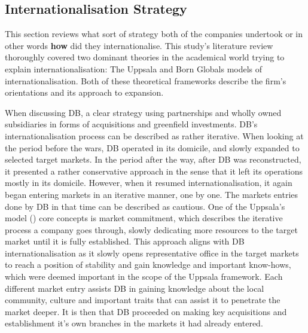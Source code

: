 \documentclass[11pt,a4paper]{article}
\begin{document}
{{{\subsection{Internationalisation Strategy}
\label{int_strategy}
This section reviews what sort of strategy both of the companies undertook or in other words \textbf{how} did they internationalise. This study's literature review thoroughly covered two dominant theories in the academical world trying to explain internationalisation: The Uppsala and Born Globals models of internationalisation. Both of these theoretical frameworks describe the firm's orientations and its approach to expansion.  \par
When discussing DB, a clear strategy using partnerships and wholly owned subsidiaries in forms of acquisitions and greenfield investments. DB's internationalisation process can be described as rather iterative. When looking at the period before the wars, DB operated in its domicile, and slowly expanded to selected target markets. In the period after the way, after DB was reconstructed, it presented a rather conservative approach in the sense that it left its operations mostly in its domicile. However, when it resumed internationalisation, it again began entering markets in an iterative manner, one by one. The markets entries done by DB in that time can be described as cautious. One of the Uppsala's model (\citeyear{johansonInternationalizationProcessFirm1977}) core concepts is market commitment, which describes the iterative process a company goes through, slowly dedicating more resources to the target market until it is fully established. This approach aligns with DB internationalisation as it slowly opens representative office in the target markets to reach a position of stability and gain knowledge and important know-hows, which were deemed important in the scope of the Uppsala framework. Each different market entry assists DB in gaining knowledge about the local community, culture and important traits that can assist it to penetrate the market deeper. It is then that DB proceeded on making key acquisitions and establishment it's own branches in the markets it had already entered. \par 
}}}
\end{document}
